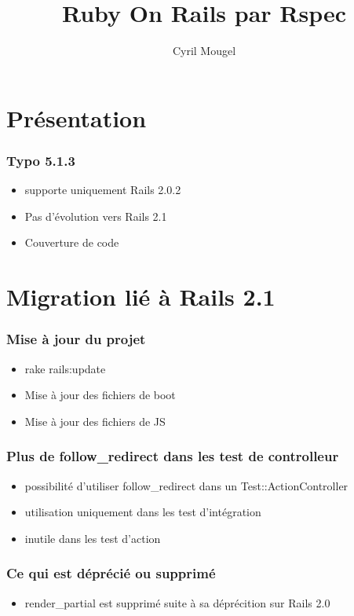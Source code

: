 \documentclass{beamer}
\title{Ruby On Rails par Rspec}
\author{Cyril Mougel}
\begin{document}
\begin{frame}
    \titlepage
\end{frame}

\section{Présentation}

\begin{frame}
	\frametitle{Typo 5.1.3}
	\begin{itemize}
		\item supporte uniquement Rails 2.0.2
		\item Pas d'évolution vers Rails 2.1
		\item Couverture de code
	\end{itemize}
\end{frame}

\section{Migration lié à Rails 2.1}

\begin{frame}
    \frametitle{Mise à jour du projet}
    \begin{itemize}
        \item rake rails:update
        \item Mise à jour des fichiers de boot
        \item Mise à jour des fichiers de JS
    \end{itemize}
\end{frame}

\begin{frame}
    \frametitle{Plus de follow\_redirect dans les test de controlleur}
    \begin{itemize}
        \item possibilité d'utiliser follow\_redirect dans un Test::ActionController
        \item utilisation uniquement dans les test d'intégration
        \item inutile dans les test d'action
    \end{itemize}
\end{frame}

\begin{frame}
    \frametitle{Ce qui est déprécié ou supprimé}
    \begin{itemize}
        \item render\_partial est supprimé suite à sa déprécition sur Rails 2.0
    \end{itemize}
\end{frame}
\end{document}

